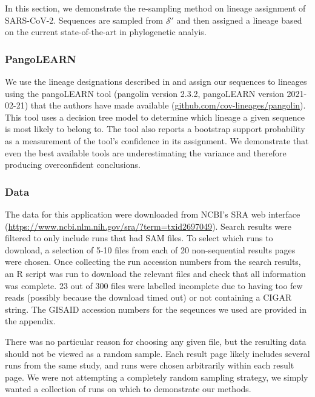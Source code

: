 \documentclass[
]{article}
\newcommand{\nps}{\mathcal{S}} %
\begin{document}
In this section, we demonstrate the re-sampling method on lineage
assignment of SARS-CoV-2. Sequences are sampled from \(\nps'\) and then
assigned a lineage based on the current state-of-the-art in phylogenetic
analyis.

\hypertarget{pangolearn}{%
\subsubsection{PangoLEARN}\label{pangolearn}}

We use the lineage designations described in
\citet{rambautDynamicNomenclatureProposal2020} and assign our sequences
to lineages using the pangoLEARN tool (pangolin version 2.3.2,
pangoLEARN version 2021-02-21) that the authors have made available
(\url{github.com/cov-lineages/pangolin}). This tool uses a decision tree
model to determine which lineage a given sequence is most likely to
belong to. The tool also reports a bootstrap support probability as a
measurement of the tool's confidence in its assignment. We demonstrate
that even the best available tools are underestimating the variance and
therefore producing overconfident conclusions.

\hypertarget{data}{%
\subsubsection{Data}\label{data}}

The data for this application were downloaded from NCBI's SRA web
interface (\url{https://www.ncbi.nlm.nih.gov/sra/?term=txid2697049}).
Search results were filtered to only include runs that had SAM files. To
select which runs to download, a selection of 5-10 files from each of 20
non-sequential results pages were chosen. Once collecting the run
accession numbers from the search results, an R script was run to
download the relevant files and check that all information was complete.
23 out of 300 files were labelled incomplete due to having too few reads
(possibly because the download timed out) or not containing a CIGAR
string. The GISAID accession numbers for the seqeunces we used are
provided in the appendix.

There was no particular reason for choosing any given file, but the
resulting data should not be viewed as a random sample. Each result page
likely includes several runs from the same study, and runs were chosen
arbitrarily within each result page. We were not attempting a completely
random sampling strategy, we simply wanted a collection of runs on which
to demonstrate our methods.
\end{document}
